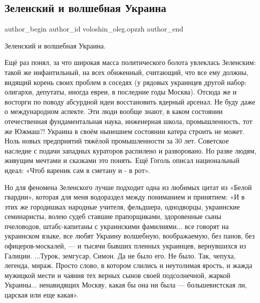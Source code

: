  
 
 
 
 
 
\subsection{Зеленский и волшебная Украина}
\label{sec:19_02_2022.fb.voloshin_oleg.opzzh.2.zelenskii_volshebnaja_ukraina}
 
\ifcmt
 author_begin
   author_id voloshin_oleg.opzzh
 author_end
\fi

Зеленский и волшебная Украина. 

Ещё раз понял, за что широкая масса политического болота увлеклась Зеленским:
такой же инфантильный, на всех обиженный, считающий, что все ему должны,
видящий корень своих проблем в соседях (у рядовых украинцев другой набор:
олигархи, депутаты, иногда евреи, в последние годы Москва). Отсюда же и
восторги по поводу абсурдной идеи восстановить ядерный арсенал. Не буду даже о
международном аспекте. Эти люди вообще знают, в каком состоянии отечественная
фундаментальная наука, инженерная школа, промышленность, тот же Южмаш?! Украина
в своём нынешнем состоянии катера строить не может. Ноль новых предприятий
тяжёлой промышленности за 30 лет. Советское наследие с подачи западных
кураторов распилено и разворовано. Но разве людям, живущим мечтами и сказками
это понять. Ещё Гоголь описал национальный идеал: «Чтоб вареник сам в сметану и
- в рот». 

Но для феномена Зеленского лучше подходит одна из любимых цитат из «Белой
гвардии», которая для меня водораздел между пониманием и принятием: «И в этих
же городишках народные учителя, фельдшера, однодворцы, украинские семинаристы,
волею судеб ставшие прапорщиками, здоровенные сыны пчеловодов, штабс-капитаны с
украинскими фамилиями... все говорят на украинском языке, все любят Украину
волшебную, воображаемую, без панов, без офицеров-москалей, — и тысячи бывших
пленных украинцев, вернувшихся из Галиции. ...Турок, земгусар, Симон. Да не было
его. Не было. Так, чепуха, легенда, мираж. Просто слово, в котором слились и
неутолимая ярость, и жажда мужицкой мести и чаяния тех верных сынов своей
подсолнечной, жаркой Украины... ненавидящих Москву, какая бы она ни была —
большевистская ли, царская или еще какая».
